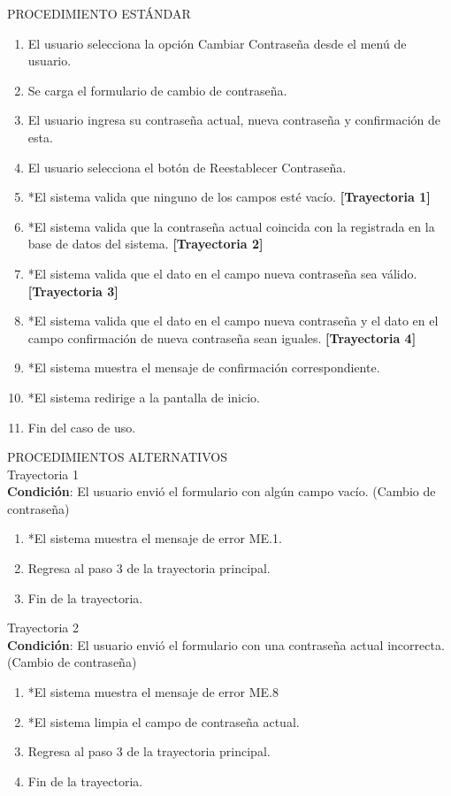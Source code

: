 \vspace*{1cm}
\noindent
\Large{PROCEDIMIENTO ESTÁNDAR}
\large{}
\begin{enumerate}
    \item El usuario selecciona la opción Cambiar Contraseña desde el menú de usuario. 
    \item Se carga el formulario de cambio de contraseña.
    \item El usuario ingresa su contraseña actual, nueva contraseña y confirmación de esta.
    \item El usuario selecciona el botón de Reestablecer Contraseña.
    \item *El sistema valida que ninguno de los campos esté vacío. \textbf{[Trayectoria 1]}
    \item *El sistema valida que la contraseña actual coincida con la registrada en la base de datos del sistema. \textbf{[Trayectoria 2]}
    \item *El sistema valida que el dato en el campo nueva contraseña sea válido. \textbf{[Trayectoria 3]}
    \item *El sistema valida que el dato en el campo nueva contraseña y el dato en el campo confirmación de nueva contraseña sean iguales. \textbf{[Trayectoria 4]} 
    \item *El sistema muestra el mensaje de confirmación correspondiente.
    \item *El sistema redirige a la pantalla de inicio.
    \item Fin del caso de uso. 
\end{enumerate}
\vspace*{1cm}
\Large{PROCEDIMIENTOS ALTERNATIVOS}\\
\large{Trayectoria 1}\\
\textbf{Condición}: El usuario envió el formulario con algún campo vacío. (Cambio de contraseña)
\begin{enumerate}
    \item *El sistema muestra el mensaje de error ME.1.
    \item Regresa al paso 3 de la trayectoria principal.
    \item Fin de la trayectoria.
\end{enumerate}
\large{Trayectoria 2}\\
\textbf{Condición}: El usuario envió el formulario con una contraseña actual incorrecta. (Cambio de contraseña)
\begin{enumerate}
    \item *El sistema muestra el mensaje de error ME.8
    \item *El sistema limpia el campo de contraseña actual.
    \item Regresa al paso 3 de la trayectoria principal.
    \item Fin de la trayectoria.
\end{enumerate}
